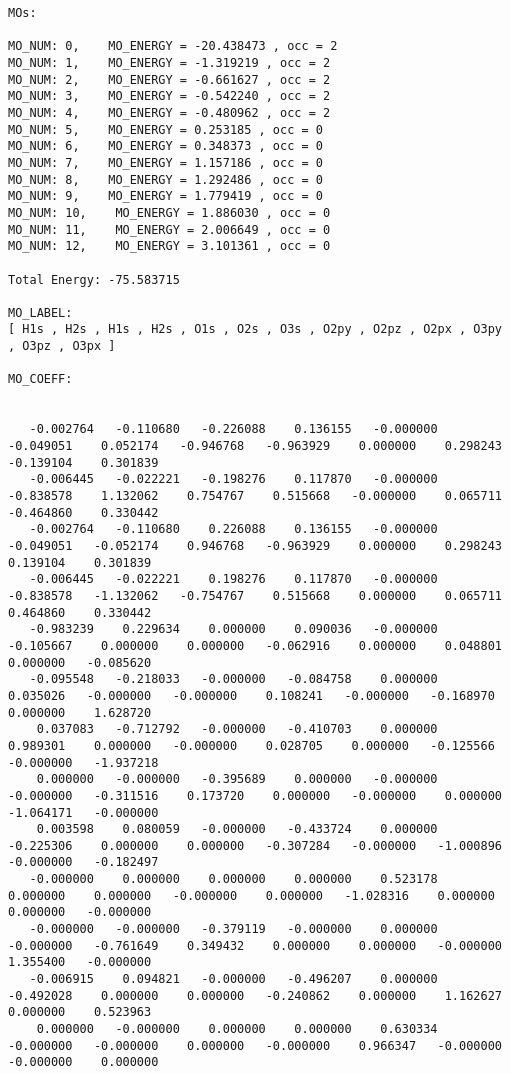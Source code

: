 \documentclass[12pt,a4paper,openany,twoside]{article}
\numberwithin{equation}{section}
\begin{document}
\begin{lstlisting}
MOs:

MO_NUM: 0,    MO_ENERGY = -20.438473 , occ = 2
MO_NUM: 1,    MO_ENERGY = -1.319219 , occ = 2
MO_NUM: 2,    MO_ENERGY = -0.661627 , occ = 2
MO_NUM: 3,    MO_ENERGY = -0.542240 , occ = 2
MO_NUM: 4,    MO_ENERGY = -0.480962 , occ = 2
MO_NUM: 5,    MO_ENERGY = 0.253185 , occ = 0
MO_NUM: 6,    MO_ENERGY = 0.348373 , occ = 0
MO_NUM: 7,    MO_ENERGY = 1.157186 , occ = 0
MO_NUM: 8,    MO_ENERGY = 1.292486 , occ = 0
MO_NUM: 9,    MO_ENERGY = 1.779419 , occ = 0
MO_NUM: 10,    MO_ENERGY = 1.886030 , occ = 0
MO_NUM: 11,    MO_ENERGY = 2.006649 , occ = 0
MO_NUM: 12,    MO_ENERGY = 3.101361 , occ = 0

Total Energy: -75.583715

MO_LABEL:
[ H1s , H2s , H1s , H2s , O1s , O2s , O3s , O2py , O2pz , O2px , O3py , O3pz , O3px ]

MO_COEFF:


   -0.002764   -0.110680   -0.226088    0.136155   -0.000000   -0.049051    0.052174   -0.946768   -0.963929    0.000000    0.298243   -0.139104    0.301839
   -0.006445   -0.022221   -0.198276    0.117870   -0.000000   -0.838578    1.132062    0.754767    0.515668   -0.000000    0.065711   -0.464860    0.330442
   -0.002764   -0.110680    0.226088    0.136155   -0.000000   -0.049051   -0.052174    0.946768   -0.963929    0.000000    0.298243    0.139104    0.301839
   -0.006445   -0.022221    0.198276    0.117870   -0.000000   -0.838578   -1.132062   -0.754767    0.515668    0.000000    0.065711    0.464860    0.330442
   -0.983239    0.229634    0.000000    0.090036   -0.000000   -0.105667    0.000000    0.000000   -0.062916    0.000000    0.048801    0.000000   -0.085620
   -0.095548   -0.218033   -0.000000   -0.084758    0.000000    0.035026   -0.000000   -0.000000    0.108241   -0.000000   -0.168970    0.000000    1.628720
    0.037083   -0.712792   -0.000000   -0.410703    0.000000    0.989301    0.000000   -0.000000    0.028705    0.000000   -0.125566   -0.000000   -1.937218
    0.000000   -0.000000   -0.395689    0.000000   -0.000000   -0.000000   -0.311516    0.173720    0.000000   -0.000000    0.000000   -1.064171   -0.000000
    0.003598    0.080059   -0.000000   -0.433724    0.000000   -0.225306    0.000000    0.000000   -0.307284   -0.000000   -1.000896   -0.000000   -0.182497
   -0.000000    0.000000    0.000000    0.000000    0.523178    0.000000    0.000000   -0.000000    0.000000   -1.028316    0.000000    0.000000   -0.000000
   -0.000000   -0.000000   -0.379119   -0.000000    0.000000   -0.000000   -0.761649    0.349432    0.000000    0.000000   -0.000000    1.355400   -0.000000
   -0.006915    0.094821   -0.000000   -0.496207    0.000000   -0.492028    0.000000    0.000000   -0.240862    0.000000    1.162627    0.000000    0.523963
    0.000000   -0.000000    0.000000    0.000000    0.630334   -0.000000   -0.000000    0.000000   -0.000000    0.966347   -0.000000   -0.000000    0.000000    
\end{lstlisting}

    
\end{document}
